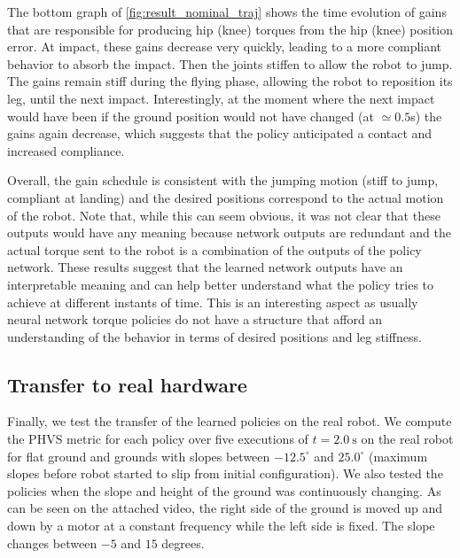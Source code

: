 The bottom graph of \cref{fig:result_nominal_traj} shows the time evolution of gains that are responsible for producing hip (knee) torques from the hip (knee)
position error. At impact, these gains decrease very quickly, leading to a more compliant behavior to absorb the impact. Then the joints stiffen to allow the robot to jump. The gains remain stiff during the flying phase, allowing the robot to reposition its leg, until the next impact. Interestingly, at the moment where the next impact would have been if the ground position would not have changed (at $\simeq 0.5$s) the gains again decrease, which
suggests that the policy anticipated a contact and increased compliance.

Overall, the gain schedule is consistent with the jumping
motion (stiff to jump, compliant at landing) and the desired positions correspond to the actual motion of the robot. Note that, while this can seem obvious, it was not clear that these outputs would have any meaning because network outputs are redundant and the actual torque sent to the robot is a combination of the outputs of the policy network.
These results suggest that the learned network outputs have an interpretable meaning and can help better understand what the policy tries to achieve at different instants of time.
This is an interesting aspect as usually neural network torque policies do not
have a structure that afford an understanding of the behavior in terms of desired positions and leg stiffness.

%
\subsection{Transfer to real hardware}
Finally, we test the transfer of the learned policies on the real robot.
We compute the PHVS metric for each policy over five executions of $t=\SI{2.0}{\second}$ on the real robot
for flat ground and grounds with slopes between $-12.5^{\circ}$ and $25.0^{\circ}$ (maximum slopes before robot started to slip from initial configuration).
We also tested the policies when the slope and height of the ground was continuously changing.
As can be seen on the attached video, the right side of the ground is moved up and down by a motor at a constant frequency while the left side is fixed. The slope changes between $-5$ and $15$ degrees.

